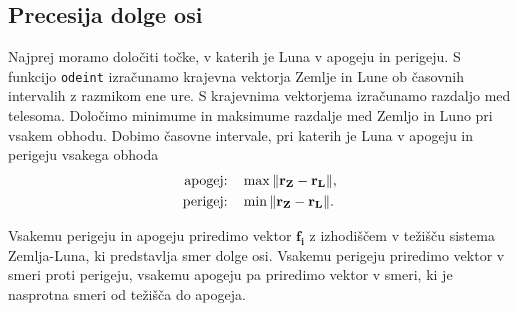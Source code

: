 \documentclass[a4paper,12pt]{article}
\renewcommand{\vec}[1]{\mathbf{#1}} %
\begin{document}
\newpage

\subsection{Precesija dolge osi}
Najprej moramo določiti točke, v katerih je Luna v apogeju in perigeju. S 
funkcijo \texttt{odeint} izračunamo krajevna vektorja Zemlje in Lune ob
časovnih intervalih z razmikom ene ure. S krajevnima vektorjema izračunamo 
razdaljo med telesoma. Določimo minimume in maksimume razdalje med Zemljo in
Luno pri vsakem obhodu. Dobimo časovne intervale, pri katerih je Luna v apogeju 
in perigeju vsakega obhoda
\begin{align*}
    \text{apogej:} \quad &\max \norm{\vec{r_Z}-\vec{r_L}}, \\
    \text{perigej:} \quad &\min \norm{\vec{r_Z}-\vec{r_L}}.
\end{align*}

\noindent
Vsakemu perigeju in apogeju priredimo vektor $\vec{f_i}$ z izhodiščem v težišču
sistema Zemlja-Luna, ki predstavlja smer dolge osi. Vsakemu perigeju priredimo
vektor v smeri proti perigeju, vsakemu apogeju pa priredimo vektor v 
smeri, ki je nasprotna smeri od težišča do apogeja.
\end{document}
